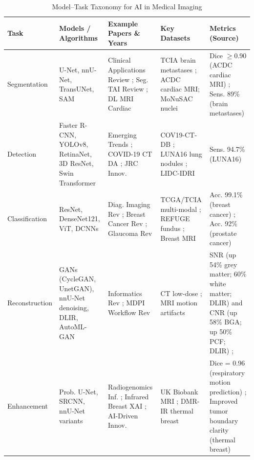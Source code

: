 \documentclass{article}
\begin{document}
\begin{table}[htbp]
\caption{Model--Task Taxonomy for AI in Medical Imaging}
\label{tab:model-task-taxonomy}
\normalsize %
\begin{tabularx}{\textwidth}{@{}p{2.4cm} p{3.2cm} Y Y Y@{}}
\toprule
\textbf{Task} & \textbf{Models / Algorithms} & \textbf{Example Papers \& Years} & \textbf{Key Datasets} & \textbf{Metrics (Source)} \\
\midrule
Segmentation &
U-Net, nnU-Net, TransUNet, SAM &
Clinical Applications Review \cite{obuchowicz_2024_clinical}; Seg. TAI Review \cite{teng_2024_a}; DL MRI Cardiac \cite{bernard_2018_deep}&
TCIA brain metastases \cite{obuchowicz_2024_clinical}; ACDC cardiac MRI; MoNuSAC nuclei \cite{teng_2024_a}&
Dice $\ge$0.90 (ACDC cardiac MRI) \cite{bernard_2018_deep}; Sens. 89\% (brain metastases) \cite{obuchowicz_2024_clinical} \\[0.5em]

Detection &
Faster R-CNN, YOLOv8, RetinaNet, 3D ResNet, Swin Transformer &
Emerging Trends \cite{oyeniyi_2024_emerging}; COVID-19 CT DA \cite{kollias_2024_domain}; JRC Innov. \cite{comtev_2025_aidriven} &
COV19-CT-DB \cite{kollias_2024_domain}; LUNA16 lung nodules \cite{comtev_2025_aidriven}; LIDC-IDRI \cite{oyeniyi_2024_emerging} &
Sens. 94.7\% (LUNA16) \cite{comtev_2025_aidriven} \\[0.5em]

Classification &
ResNet, DenseNet121, ViT, DCNNs &
Diag. Imaging Rev \cite{khalifa_2024_ai}; Breast Cancer Rev \cite{zheng_2023_overview}; Glaucoma Rev \cite{paulo_2024_advancements} &
TCGA/TCIA multi-modal \cite{tang_2019_the}; REFUGE fundus \cite{paulo_2024_advancements}; Breast MRI \cite{zheng_2023_overview}&
Acc. 99.1\% (breast cancer) \cite{zheng_2023_overview}; Acc. 92\% (prostate cancer) \cite{obuchowicz_2024_clinical} \\[0.5em]

Reconstruction &
GANs (CycleGAN, UnetGAN), nnU-Net denoising, DLIR, AutoML-GAN &
Informatics Rev \cite{panayides_2020_ai}; MDPI Workflow Rev \cite{obuchowicz_2024_clinical} &
CT low-dose \cite{obuchowicz_2024_clinical}; MRI motion artifacts \cite{panayides_2020_ai} &
SNR (up 54\% grey matter; 60\% white matter; DLIR) and CNR (up 58\% BGA; up 50\% PCF; DLIR) \cite{obuchowicz_2024_clinical}; \\[0.5em]

Enhancement &
Prob. U-Net, SRCNN, nnU-Net variants &
Radiogenomics Inf. \cite{panayides_2020_ai}; Infrared Breast XAI \cite{raghavan_2024_explainable}; AI-Driven Innov. \cite{comtev_2025_aidriven} &
UK Biobank MRI \cite{panayides_2020_ai}; DMR-IR thermal breast \cite{raghavan_2024_explainable}&
Dice = 0.96 (respiratory motion prediction) \cite{obuchowicz_2024_clinical}; Improved tumor boundary clarity (thermal breast) \cite{raghavan_2024_explainable} \\[0.5em]


\end{tabularx}
\end{table}
\end{document}
